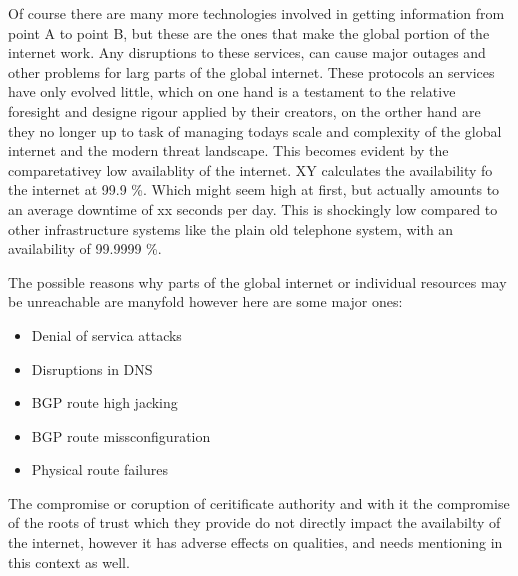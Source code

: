 \documentclass[../eva1_scion.tex]{subfiles}
\begin{document}
Of course there are many more technologies involved in getting information from point A to point B, but these are the ones that make the global portion of the internet work. Any disruptions to these services, can cause major outages and other problems for larg parts of the global internet. These protocols an services have only evolved little, which on one hand is a testament to the relative foresight and designe rigour applied by their creators, on the orther hand are they no longer up to task of managing todays scale and complexity of the global internet and the modern threat landscape. This becomes evident by the comparetativey low availablity of the internet. XY calculates the availability fo the internet at 99.9 \%. Which might seem high at first, but actually amounts to an average downtime of xx seconds per day. This is shockingly low compared to other infrastructure systems like the plain old telephone system, with an availability of 99.9999 \%. 

The possible reasons why parts of the global internet or individual resources may be unreachable are manyfold however here are some major ones:

\begin{itemize}
    \item Denial of servica attacks
    \item Disruptions in DNS
    \item BGP route high jacking
    \item BGP route missconfiguration
    \item Physical route failures
\end{itemize}

The compromise or coruption of ceritificate authority and with it the compromise of the roots of trust which they provide do not directly impact the availabilty of the internet, however it has adverse effects on qualities, and needs mentioning in this context as well.
\end{document}
